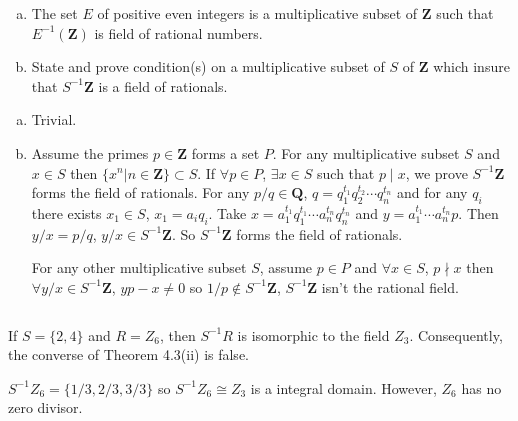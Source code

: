 $$ $$

\begin{ex}
    \begin{enumerate}[(a)]
        \item The set $E$ of positive even integers is a multiplicative subset of $\mathbf{Z}$ such that $E^{-1}(\mathbf{Z})$ is field of rational numbers.
        \item State and prove condition(s) on a multiplicative subset of $S$ of $\mathbf{Z}$ which insure that $S^{-1}\mathbf{Z}$ is a field of rationals.
    \end{enumerate}
\end{ex}

\begin{answer}
    \begin{enumerate}[(a)]
        \item Trivial.
        \item Assume the primes $p\in \mathbf{Z}$ forms a set $P$. For any multiplicative subset $S$ and $x\in S$ then $\{x^{n}|n\in\mathbf{Z}\}\subset S$. If $\forall p\in P$, $\exists x\in S$ such that $p\mid x$, we prove $S^{-1}\mathbf{Z}$ forms the field of rationals. For any $p /q\in \mathbf{Q}$, $q=q_{1}^{t_{1}}q_{2}^{t_{2}}\cdots q_{n}^{t_{n}}$ and for any $q_{i}$ there exists $x_{1}\in S$, $x_{1}=a_{i}q_{i}$. Take $x=a_{1}^{t_{1}}q_{1}^{t_{1}}\cdots a_{n}^{t_{n}}q_{n}^{t_{n}}$ and $y=a_{1}^{t_{1}}\cdots a_{n}^{t_{n}}p$. Then $y /x=p /q$, $y /x\in S^{-1}\mathbf{Z}$. So $S^{-1}\mathbf{Z}$ forms the field of rationals.
         
        For any other multiplicative subset $S$, assume $p\in P$ and $\forall x\in S$, $p\nmid x$ then $\forall y /x\in S^{-1}\mathbf{Z}$, $yp-x\neq 0$ so $1 /p\notin S^{-1}\mathbf{Z}$, $S^{-1}\mathbf{Z}$ isn't the rational field.
    \end{enumerate}
\end{answer}

$$ $$

\begin{ex}
    If $S=\{2,4\}$ and $R=Z_{6}$, then $S^{-1}R$ is isomorphic to the field $Z_{3}$. Consequently, the converse of Theorem 4.3(ii) is false.
\end{ex}

\begin{answer}
    $S^{-1}Z_{6}=\{1 /3, 2/3, 3 /3\}$ so $S^{-1}Z_{6}\cong Z_{3}$ is a integral domain. However, $Z_{6}$ has no zero divisor.
\end{answer}

